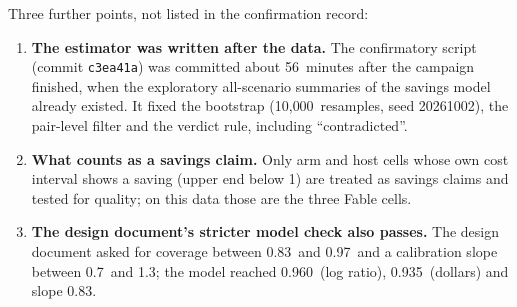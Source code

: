 \documentclass[11pt,letterpaper]{article}
\newcommand{\code}[1]{\texttt{#1}}
\newcommand{\Boot}{10{,}000}
\newcommand{\BootSeed}{20261002}
\newcommand{\ConfirmAfterMin}{56}
\newcommand{\ConfirmSha}{c3ea41a}
\newcommand{\DesignCovHigh}{0.97}
\newcommand{\DesignCovLow}{0.83}
\newcommand{\DesignSlopeHigh}{1.3}
\newcommand{\DesignSlopeLow}{0.7}
\newcommand{\MCCovLog}{0.960}
\newcommand{\MCCovUSD}{0.935}
\newcommand{\MCSlope}{0.83}
\begin{document}
Three further points, not listed in the confirmation record:
\begin{enumerate}[leftmargin=1.4em,label=(\alph*)]
  \item \textbf{The estimator was written after the data.} The confirmatory script (commit
    \code{\ConfirmSha}) was committed about \ConfirmAfterMin\ minutes after the campaign finished, when the
    exploratory all-scenario summaries of the savings model already existed. It fixed the bootstrap (\Boot\
    resamples, seed \BootSeed), the pair-level filter and the verdict rule, including ``contradicted''.
  \item \textbf{What counts as a savings claim.} Only arm and host cells whose own cost interval shows a saving
    (upper end below 1) are treated as savings claims and tested for quality; on this data those are the three
    Fable cells.
  \item \textbf{The design document's stricter model check also passes.} The design document asked for
    coverage between \DesignCovLow\ and \DesignCovHigh\ and a calibration slope between \DesignSlopeLow\ and
    \DesignSlopeHigh; the model reached \MCCovLog\ (log ratio), \MCCovUSD\ (dollars) and slope \MCSlope.
\end{enumerate}
\end{document}
